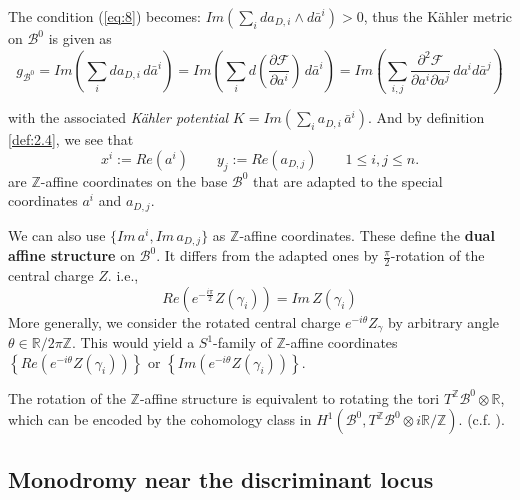 \documentclass{article}
\begin{document}
The condition (\ref{eq:8}) becomes: $Im\left(\sum_{i}d{a}_{D,i}\wedge d\bar{a}^{i}\right)>0$, thus the K\"ahler metric on $\mathcal{B}^{0}$ is given as
\begin{equation}\label{eq:11}
    g_{\mathcal{B}^{0}}=Im\left(\sum_{i}d{a}_{D,i}\, d\bar{a}^{i}\right)=Im\left(\sum_{i}d\left(\frac{\partial\mathcal{F}}{\partial a^{i}}\right)\, d\bar{a}^{i}\right)=Im\left(\sum_{i,j}\frac{\partial^{2}\mathcal{F}}{\partial a^{i}\partial a^{j}}\, da^{i}d\bar{a}^{j}\right)
\end{equation}

with the associated \textit{K\"ahler potential} $K=Im\left(\sum_{i}a_{D,i}\,\bar{a}^{i}\right)$. And by definition \ref{def:2.4}, we see that \[x^{i}:=Re(a^{i})\qquad y_{j}:=Re(a_{D,j})\qquad 1\leq i,j\leq n.\] are $\mathbb{Z}$-affine coordinates on the base $\mathcal{B}^{0}$ that are adapted to the special coordinates $a^{i}$ and $a_{D,j}$.

\begin{remark}\label{re3.2}
We can also use $\{Im\, a^{i},Im\,a_{D,j}\}$ as $\mathbb{Z}$-affine coordinates. These define the \textbf{dual affine structure} on $\mathcal{B}^{0}$. It differs from the adapted ones by $\frac{\pi}{2}$-rotation of the central charge $Z$. i.e.,
\begin{equation}\label{eq:12}
    Re\left(e^{-\frac{i\pi}{2}}Z(\gamma_{i})\right)=Im\,Z(\gamma_{i})
\end{equation}
More generally, we consider the rotated central charge $e^{-i\theta}Z_{\gamma}$ by arbitrary angle $\theta\in\mathbb{R}/2\pi\mathbb{Z}$. This would yield a $S^{1}$-family of $\mathbb{Z}$-affine coordinates $\left\{Re(e^{-i\theta}Z(\gamma_{i}))\right\}$ or $\left\{Im(e^{-i\theta}Z(\gamma_{i}))\right\}$.
\end{remark}

\begin{remark}
The rotation of the $\mathbb{Z}$-affine structure is equivalent to rotating the tori $T^{\mathbb{Z}}\mathcal{B}^{0}\otimes\mathbb{R}$, which can be encoded by the cohomology class in $H^{1}(\mathcal{B}^{0},T^{\mathbb{Z}}\mathcal{B}^{0}\otimes i\mathbb{R}/\mathbb{Z}).$ (c.f. \cite{kontsevich2011lectures}).
\end{remark}


\subsection{Monodromy near the discriminant locus}\label{sec:3.3}
\end{document}
